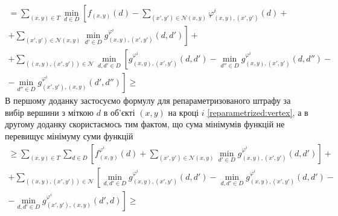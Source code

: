 \begin{equation*}
\begin{gathered}
    = \sum \limits_{\left(x, y \right) \in T}
        \min \limits_{d \in D} \left[
            f_{\left(x, y \right)} \left( d \right) -
            \sum \limits_{\left(x', y' \right) \in \mathcal{N} \left(x, y \right)}
                \varphi_{\left(x, y \right), \left(x', y' \right)}^i
                    \left(d \right) + \right. \\
                \left. + \sum \limits_{\left(x', y' \right) \in \mathcal{N} \left(x, y \right)}
                \min \limits_{d' \in D}
                    g_{\left(x, y \right), \left(x', y' \right)}^{\varphi^i}
                        \left(d, d' \right)
        \right] + \\
    + \sum \limits_{\left(\left(x, y \right), \left(x', y' \right)\right)\in\mathcal{N}}
        \min \limits_{d,d' \in D} \left[
            g_{\left(x, y \right), \left(x', y' \right)}^{\varphi^i}
                \left(d, d' \right) -
            \min \limits_{d'' \in D}
                g_{\left(x, y \right), \left(x', y' \right)}^{\varphi^i}
                    \left(d, d'' \right) - \right. \\
            \left. - \min \limits_{d'' \in D}
                g_{\left(x', y' \right), \left(x, y \right)}^{\varphi^i}
                    \left(d', d'' \right)
        \right] \ge
\end{gathered}
\end{equation*}
В першому доданку
застосуємо формулу для репараметризованого штрафу за вибір вершини з міткою $d$
в об'єкті $\left(x, y \right)$ на кроці $i$ \eqref{reparametrized:vertex},
а в другому доданку скористаємось тим фактом,
що сума мінімумів функцій не перевищує мінімуму суми функцій
\begin{equation*}
\begin{gathered}
    \ge \sum \limits_{\left(x, y \right) \in T}
        \sum \limits_{d \in D} \left[
            f_{\left(x, y \right)}^{\varphi^i} \left(d \right) +
            \sum \limits_{\left(x', y' \right) \in \mathcal{N} \left(x, y \right)}
                \min \limits_{d' \in D}
                    g_{\left(x, y \right), \left(x', y' \right)}^{\varphi^i}
                        \left(d, d' \right)
        \right] + \\
    + \sum \limits_{\left(\left(x, y \right), \left(x', y' \right) \right)\in \mathcal{N}}
    \left[
        \min\limits_{d, d' \in D}
            g_{\left(x, y \right), \left(x', y' \right)}^{\varphi^i}
                \left(d, d' \right) -
        \min\limits_{d, d' \in D}
            g_{\left(x, y \right), \left(x', y' \right)}^{\varphi^i}
                \left(d, d' \right) - \right. \\
        \left. - \min\limits_{d, d' \in D}
            g_{\left(x', y' \right), \left(x, y \right)}^{\varphi^i}
                \left(d', d \right)
    \right] \ge
\end{gathered}
\end{equation*}
